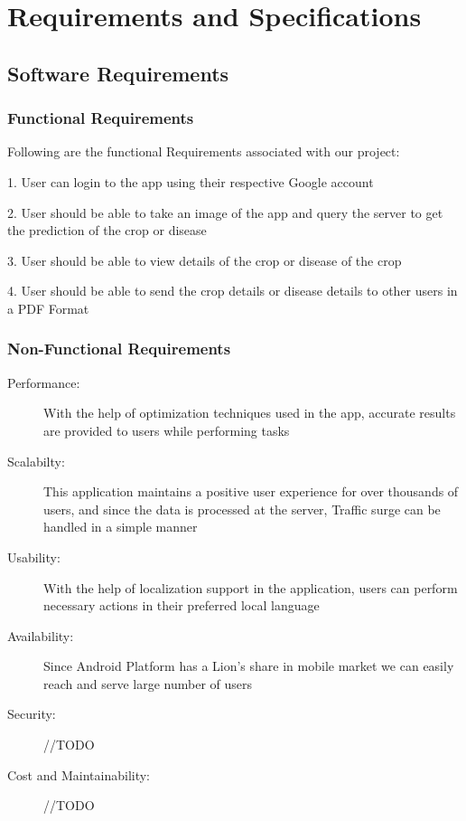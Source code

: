 \documentclass[../Report.tex]{subfiles}
\begin{document}
\chapter{Requirements and  Specifications}

\section{Software Requirements}

\subsection{Functional Requirements}

Following are the functional Requirements associated with our project:

1. User can login to the app using their respective Google account

2. User should be able to take an image of the app and query the server to get the prediction of the crop or disease

3. User should be able to view details of the crop or disease of the crop

4. User should be able to send the crop details or disease details to other users in a PDF Format

\subsection{Non-Functional Requirements}
\begin{description}
  \item[Performance: ] With the help of optimization techniques used in the app, accurate results are provided to users while performing tasks
  
  \item[Scalabilty: ] This application maintains a positive user experience for over thousands of users, and since the data is processed
at the server, Traffic surge can be handled in a simple manner

  \item[Usability: ] With the help of localization support in the application, users can perform necessary actions in their preferred local language

  \item[Availability: ] Since Android Platform has a Lion's share in mobile market we can easily reach and serve large number of users

  \item[Security: ] //TODO

  \item[Cost and Maintainability: ] //TODO
\end{description} 
\end{document}
